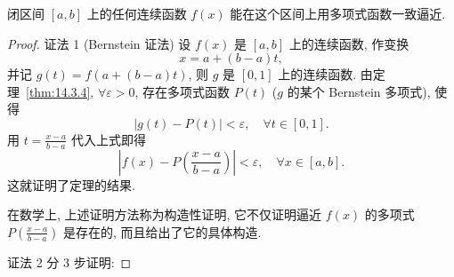\begin{theorem}[Weierstrass]\label{thm:14.3.5}
闭区间 $[a,b]$ 上的任何连续函数 $f(x)$ 能在这个区间上用多项式函数一致逼近.
\end{theorem}

\begin{proof}
证法 1 (Bernstein 证法) 设 $f(x)$ 是 $[a,b]$ 上的连续函数, 作变换
\[
  x=a+(b-a)t,
\]
并记 $g(t)=f(a+(b-a)t)$, 则 $g$ 是 $[0,1]$ 上的连续函数. 由定理~\ref{thm:14.3.4}, $\forall\varepsilon>0$, 存在多项式函数 $P(t)$ ($g$ 的某个 Bernstein 多项式), 使得
\[
  |g(t)-P(t)|<\varepsilon,\quad\forall t\in[0,1].
\]
用 $t=\frac{x-a}{b-a}$ 代入上式即得
\[
  \left|f(x)-P\left(\frac{x-a}{b-a}\right)\right|<\varepsilon,\quad\forall x\in[a,b].
\]
这就证明了定理的结果.

在数学上, 上述证明方法称为构造性证明, 它不仅证明逼近 $f(x)$ 的多项式 $P\left(\frac{x-a}{b-a}\right)$ 是存在的, 而且给出了它的具体构造.

证法 2 分 $3$ 步证明:


\end{proof}
